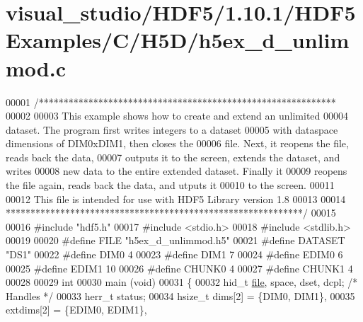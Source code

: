 \hypertarget{visual__studio_2_h_d_f5_21_810_81_2_h_d_f5_examples_2_c_2_h5_d_2h5ex__d__unlimmod_8c_source}{}\section{visual\+\_\+studio/\+H\+D\+F5/1.10.1/\+H\+D\+F5\+Examples/\+C/\+H5\+D/h5ex\+\_\+d\+\_\+unlimmod.c}
\label{visual__studio_2_h_d_f5_21_810_81_2_h_d_f5_examples_2_c_2_h5_d_2h5ex__d__unlimmod_8c_source}

\begin{DoxyCode}
00001 \textcolor{comment}{/************************************************************}
00002 \textcolor{comment}{}
00003 \textcolor{comment}{  This example shows how to create and extend an unlimited}
00004 \textcolor{comment}{  dataset.  The program first writes integers to a dataset}
00005 \textcolor{comment}{  with dataspace dimensions of DIM0xDIM1, then closes the}
00006 \textcolor{comment}{  file.  Next, it reopens the file, reads back the data,}
00007 \textcolor{comment}{  outputs it to the screen, extends the dataset, and writes}
00008 \textcolor{comment}{  new data to the entire extended dataset.  Finally it}
00009 \textcolor{comment}{  reopens the file again, reads back the data, and utputs it}
00010 \textcolor{comment}{  to the screen.}
00011 \textcolor{comment}{}
00012 \textcolor{comment}{  This file is intended for use with HDF5 Library version 1.8}
00013 \textcolor{comment}{}
00014 \textcolor{comment}{ ************************************************************/}
00015 
00016 \textcolor{preprocessor}{#include "hdf5.h"}
00017 \textcolor{preprocessor}{#include <stdio.h>}
00018 \textcolor{preprocessor}{#include <stdlib.h>}
00019 
00020 \textcolor{preprocessor}{#define FILE            "h5ex\_d\_unlimmod.h5"}
00021 \textcolor{preprocessor}{#define DATASET         "DS1"}
00022 \textcolor{preprocessor}{#define DIM0            4}
00023 \textcolor{preprocessor}{#define DIM1            7}
00024 \textcolor{preprocessor}{#define EDIM0           6}
00025 \textcolor{preprocessor}{#define EDIM1           10}
00026 \textcolor{preprocessor}{#define CHUNK0          4}
00027 \textcolor{preprocessor}{#define CHUNK1          4}
00028 
00029 \textcolor{keywordtype}{int}
00030 main (\textcolor{keywordtype}{void})
00031 \{
00032     hid\_t           \hyperlink{structfile}{file}, space, dset, dcpl;    \textcolor{comment}{/* Handles */}
00033     herr\_t          status;
00034     hsize\_t         dims[2] = \{DIM0, DIM1\},
00035                     extdims[2] = \{EDIM0, EDIM1\},

\end{DoxyCode}
